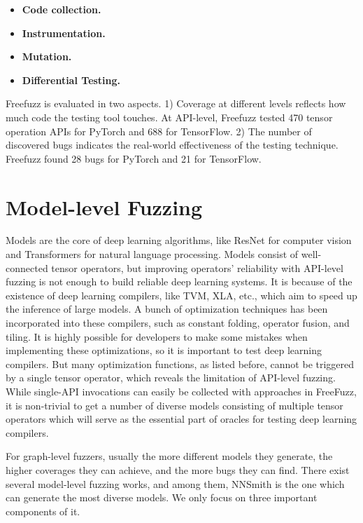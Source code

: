 \documentclass{article}
\begin{document}
\begin{itemize}
    \item \textbf{Code collection.}
    \item \textbf{Instrumentation.}
    \item \textbf{Mutation.}
    \item \textbf{Differential Testing.}
\end{itemize}

Freefuzz is evaluated in two aspects. 1) Coverage at different levels reflects how much code the testing tool touches. At API-level, Freefuzz tested 470 tensor operation APIs for PyTorch and 688 for TensorFlow. 2) The number of discovered bugs indicates the real-world effectiveness of the testing technique. Freefuzz found 28 bugs for PyTorch and 21 for TensorFlow.

\section{Model-level Fuzzing}

Models are the core of deep learning algorithms, like ResNet for computer vision and Transformers for natural language processing. Models consist of well-connected tensor operators, but improving operators' reliability with API-level fuzzing is not enough to build reliable deep learning systems. It is because of the existence of deep learning compilers, like TVM, XLA, etc., which aim to speed up the inference of large models. A bunch of optimization techniques has been incorporated into these compilers, such as constant folding, operator fusion, and tiling. It is highly possible for developers to make some mistakes when implementing these optimizations, so it is important to test deep learning compilers. But many optimization functions, as listed before, cannot be triggered by a single tensor operator, which reveals the limitation of API-level fuzzing. While single-API invocations can easily be collected with approaches in FreeFuzz, it is non-trivial to get a number of diverse models consisting of multiple tensor operators which will serve as the essential part of oracles for testing deep learning compilers.

For graph-level fuzzers, usually the more different models they generate, the higher coverages they can achieve, and the more bugs they can find. There exist several model-level fuzzing works, and among them, NNSmith is the one which can generate the most diverse models. We only focus on three important components of it.
\end{document}
